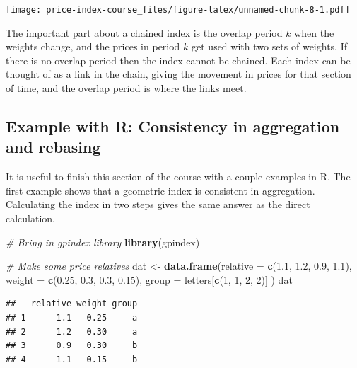 \documentclass[]{article}
\newenvironment{Shaded}{\begin{snugshade}}{\end{snugshade}}
\newcommand{\CommentTok}[1]{\textcolor[rgb]{0.56,0.35,0.01}{\textit{#1}}}
\newcommand{\ControlFlowTok}[1]{\textcolor[rgb]{0.13,0.29,0.53}{\textbf{#1}}}
\newcommand{\DataTypeTok}[1]{\textcolor[rgb]{0.13,0.29,0.53}{#1}}
\newcommand{\DecValTok}[1]{\textcolor[rgb]{0.00,0.00,0.81}{#1}}
\newcommand{\FloatTok}[1]{\textcolor[rgb]{0.00,0.00,0.81}{#1}}
\newcommand{\KeywordTok}[1]{\textcolor[rgb]{0.13,0.29,0.53}{\textbf{#1}}}
\newcommand{\NormalTok}[1]{#1}
\newcommand{\OperatorTok}[1]{\textcolor[rgb]{0.81,0.36,0.00}{\textbf{#1}}}
\newcommand{\StringTok}[1]{\textcolor[rgb]{0.31,0.60,0.02}{#1}}
\begin{document}
\texttt{[image: price-index-course\_files/figure-latex/unnamed-chunk-8-1.pdf]}

The important part about a chained index is the overlap period \(k\) when the weights change, and the prices in period \(k\) get used with two sets of weights. If there is no overlap period then the index cannot be chained. Each index can be thought of as a link in the chain, giving the movement in prices for that section of time, and the overlap period is where the links meet.

\hypertarget{example-with-r-consistency-in-aggregation-and-rebasing}{%
\subsection{Example with R: Consistency in aggregation and rebasing}\label{example-with-r-consistency-in-aggregation-and-rebasing}}

It is useful to finish this section of the course with a couple examples in R. The first example shows that a geometric index is consistent in aggregation. Calculating the index in two steps gives the same answer as the direct calculation.

\begin{Shaded}
\begin{Highlighting}[]
\CommentTok{# Bring in gpindex library}
\KeywordTok{library}\NormalTok{(gpindex)}

\CommentTok{# Make some price relatives}
\NormalTok{dat <-}\StringTok{ }\KeywordTok{data.frame}\NormalTok{(}\DataTypeTok{relative =} \KeywordTok{c}\NormalTok{(}\FloatTok{1.1}\NormalTok{, }\FloatTok{1.2}\NormalTok{, }\FloatTok{0.9}\NormalTok{, }\FloatTok{1.1}\NormalTok{),}
                  \DataTypeTok{weight =} \KeywordTok{c}\NormalTok{(}\FloatTok{0.25}\NormalTok{, }\FloatTok{0.3}\NormalTok{, }\FloatTok{0.3}\NormalTok{, }\FloatTok{0.15}\NormalTok{),}
                  \DataTypeTok{group =}\NormalTok{ letters[}\KeywordTok{c}\NormalTok{(}\DecValTok{1}\NormalTok{, }\DecValTok{1}\NormalTok{, }\DecValTok{2}\NormalTok{, }\DecValTok{2}\NormalTok{)]}
\NormalTok{)}
\NormalTok{dat}
\end{Highlighting}
\end{Shaded}

\begin{verbatim}
##   relative weight group
## 1      1.1   0.25     a
## 2      1.2   0.30     a
## 3      0.9   0.30     b
## 4      1.1   0.15     b
\end{verbatim}

\begin{Shaded}
\end{Shaded}
\end{document}
